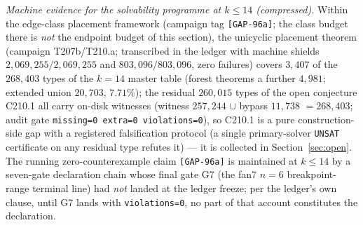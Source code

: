 \emph{Machine evidence for the solvability programme at $k\le14$ (compressed).} Within the
edge-class placement framework (campaign tag \texttt{[GAP-96a]}; the class budget there is
\emph{not} the endpoint budget of this section), the unicyclic placement theorem (campaign
T207b/T210.a; transcribed in the ledger with machine shields $2{,}069{,}255/2{,}069{,}255$
and $803{,}096/803{,}096$, zero failures) covers $3{,}407$ of the $268{,}403$ types of the
$k=14$ master table (forest theorems a further $4{,}981$; extended union $20{,}703$,
$7.71\%$); the residual $260{,}015$ types of the open conjecture C210.1 all carry on-disk
witnesses (witness $257{,}244$ $\cup$ bypass $11{,}738$ $=268{,}403$; audit gate
\texttt{missing=0 extra=0 violations=0}), so C210.1 is a pure construction-side gap with a
registered falsification protocol (a single primary-solver \texttt{UNSAT} certificate on any
residual type refutes it) --- it is collected in Section~\ref{sec:open}. The running
zero-counterexample claim \texttt{[GAP-96a]} is maintained at $k\le14$ by a seven-gate
declaration chain whose final gate G7 (the fan7 $n=6$ breakpoint-range terminal line) had
\emph{not} landed at the ledger freeze; per the ledger's own clause, until G7 lands with
\texttt{violations=0}, no part of that account constitutes the declaration.

